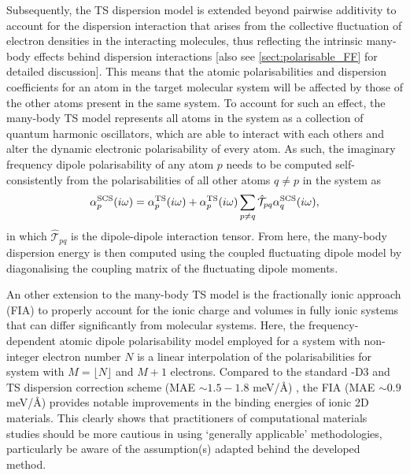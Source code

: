 Subsequently, the TS dispersion model is extended beyond pairwise additivity to account for the dispersion interaction that arises from the collective fluctuation of electron densities in the interacting molecules, thus reflecting the intrinsic many-body effects behind dispersion interactions\cite{tkatchenko2012accurate,tkatchenko2013interatomic} [also see \cref{sect:polarisable_FF} for detailed discussion]. This means that the atomic polarisabilities and dispersion coefficients for an atom in the target molecular system will be affected by those of the other atoms present in the same system. To account for such an effect, the many-body TS model represents all atoms in the system as a collection of quantum harmonic oscillators, which are able to interact with each others and alter the dynamic electronic polarisability of every atom. As such, 
the imaginary frequency dipole polarisability of any atom $p$ needs to be computed self-consistently from the polarisabilities of all other atoms $q\neq p$ in the system as
\begin{equation}\label{eq:SCS_polarisation}
\alpha_{p}^{\mbox{\scriptsize{SCS}}}(i\omega)=\alpha_{p}^{\mbox{\scriptsize{TS}}}(i\omega)+\alpha_{p}^{\mbox{\scriptsize{TS}}}(i\omega)\sum_{p\neq q}\hat{\mathcal{T}}_{pq}\alpha_{q}^{\mbox{\scriptsize{SCS}}}(i\omega),
\end{equation}
 in which $\hat{\mathcal{T}}_{pq}$ is the dipole-dipole interaction tensor. From here, the many-body dispersion energy is then computed using the coupled fluctuating dipole model by diagonalising the coupling matrix of the fluctuating dipole moments.

An other extension to the many-body TS model is the fractionally ionic approach (FIA)\cite{gould2016fractionally} to properly account for the ionic charge and volumes in fully ionic systems that can differ significantly from molecular systems. Here, the frequency-dependent atomic dipole polarisability model employed for a system with non-integer electron number $N$ is a linear interpolation of the polarisabilities for system with $M=\lfloor N \rfloor$ and $M+1$ electrons. Compared to the standard -D3 and TS dispersion correction scheme (MAE $\sim 1.5-1.8$ meV/\AA) , the FIA (MAE $\sim 0.9$ meV/\AA) provides notable improvements in the binding energies of ionic 2D materials.\cite{tawfik2018evaluation} This clearly shows that practitioners of computational materials studies should be more cautious in using `generally applicable' methodologies, particularly be aware of the assumption(s) adapted behind the developed method.

